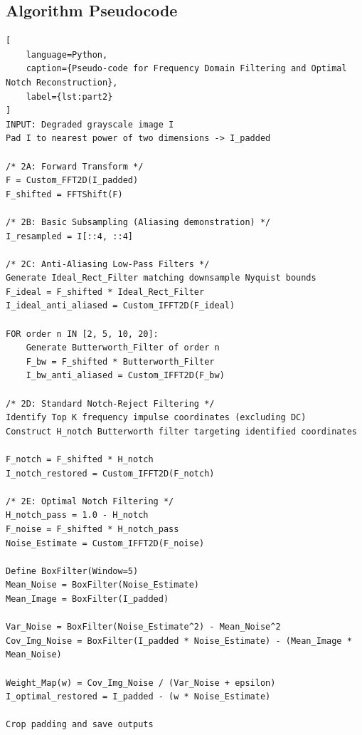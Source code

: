 \documentclass[11pt,a4paper]{article}
\begin{document}
\subsection{Algorithm Pseudocode}
\begin{lstlisting}[
    language=Python,
    caption={Pseudo-code for Frequency Domain Filtering and Optimal Notch Reconstruction},
    label={lst:part2}
]
INPUT: Degraded grayscale image I
Pad I to nearest power of two dimensions -> I_padded

/* 2A: Forward Transform */
F = Custom_FFT2D(I_padded)
F_shifted = FFTShift(F)

/* 2B: Basic Subsampling (Aliasing demonstration) */
I_resampled = I[::4, ::4]

/* 2C: Anti-Aliasing Low-Pass Filters */
Generate Ideal_Rect_Filter matching downsample Nyquist bounds
F_ideal = F_shifted * Ideal_Rect_Filter
I_ideal_anti_aliased = Custom_IFFT2D(F_ideal)

FOR order n IN [2, 5, 10, 20]:
    Generate Butterworth_Filter of order n
    F_bw = F_shifted * Butterworth_Filter
    I_bw_anti_aliased = Custom_IFFT2D(F_bw)

/* 2D: Standard Notch-Reject Filtering */
Identify Top K frequency impulse coordinates (excluding DC)
Construct H_notch Butterworth filter targeting identified coordinates

F_notch = F_shifted * H_notch
I_notch_restored = Custom_IFFT2D(F_notch)

/* 2E: Optimal Notch Filtering */
H_notch_pass = 1.0 - H_notch
F_noise = F_shifted * H_notch_pass
Noise_Estimate = Custom_IFFT2D(F_noise)

Define BoxFilter(Window=5)
Mean_Noise = BoxFilter(Noise_Estimate)
Mean_Image = BoxFilter(I_padded)

Var_Noise = BoxFilter(Noise_Estimate^2) - Mean_Noise^2
Cov_Img_Noise = BoxFilter(I_padded * Noise_Estimate) - (Mean_Image * Mean_Noise)

Weight_Map(w) = Cov_Img_Noise / (Var_Noise + epsilon)
I_optimal_restored = I_padded - (w * Noise_Estimate)

Crop padding and save outputs
\end{lstlisting}
\end{document}
